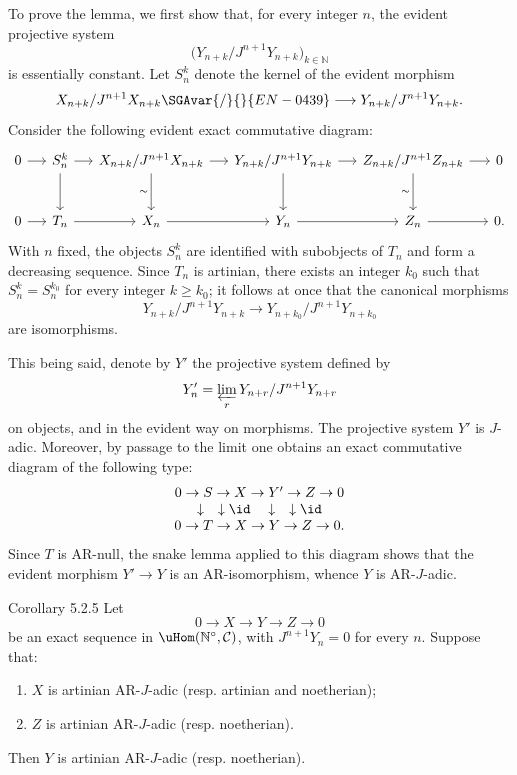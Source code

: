 \begin{prooftext}
To prove the lemma, we first show that, for every integer \(n\), the evident projective system
\[
\bigl(Y_{n+k}/J^{n+1}Y_{n+k}\bigr)_{k\in\mathbb N}
\]
is essentially constant. Let \(S_n^k\) denote the kernel of the evident morphism
\[
X_{n+k}/J^{n+1}X_{n+k}\SGAvar{/}{}{EN-0439}\longrightarrow
Y_{n+k}/J^{n+1}Y_{n+k}.
\]
Consider the following evident exact commutative diagram:
\[
\begin{tikzcd}[column sep=1.35em,row sep=large]
0 \arrow[r] & S_n^k \arrow[r] \arrow[d] & X_{n+k}/J^{n+1}X_{n+k} \arrow[r] \arrow[d,"\sim"'] & Y_{n+k}/J^{n+1}Y_{n+k} \arrow[r] \arrow[d] & Z_{n+k}/J^{n+1}Z_{n+k} \arrow[r] \arrow[d,"\sim"'] & 0\\
0 \arrow[r] & T_n \arrow[r] & X_n \arrow[r] & Y_n \arrow[r] & Z_n \arrow[r] & 0 .
\end{tikzcd}
\]
With \(n\) fixed, the objects \(S_n^k\) are identified with subobjects of \(T_n\) and form a decreasing sequence. Since \(T_n\) is artinian, there exists an integer \(k_0\) such that \(S_n^k=S_n^{k_0}\) for every integer \(k\ge k_0\); it follows at once that the canonical morphisms
\[
Y_{n+k}/J^{n+1}Y_{n+k}
\longrightarrow
Y_{n+k_0}/J^{n+1}Y_{n+k_0}
\]
are isomorphisms.

This being said, denote by \(Y'\) the projective system defined by
\[
Y'_n=\varprojlim_r Y_{n+r}/J^{n+1}Y_{n+r}
\]
on objects, and in the evident way on morphisms. The projective system \(Y'\) is \(J\)-adic. Moreover, by passage to the limit one obtains an exact commutative diagram of the following type:
\[
\begin{array}{ccccc}
0\to S\to X\to Y'\to Z\to0\\
\downarrow\quad\downarrow\id\quad\downarrow\quad\downarrow\id\\
0\to T\to X\to Y\to Z\to0 .
\end{array}
\]
Since \(T\) is AR-null, the snake lemma applied to this diagram shows that the evident morphism \(Y'\to Y\) is an AR-isomorphism, whence \(Y\) is AR-\(J\)-adic.
\end{prooftext}

\begin{statement}{Corollary 5.2.5}
Let
\[
0\longrightarrow X\longrightarrow Y\longrightarrow Z\longrightarrow0
\]
be an exact sequence in \(\uHom(\mathbb N^\circ,\mathcal C)\), with \(J^{n+1}Y_n=0\) for every \(n\). Suppose that:
\begin{enumerate}[label=\textup{(\roman*)}]
\item \(X\) is artinian AR-\(J\)-adic (resp. artinian and noetherian);
\item \(Z\) is artinian AR-\(J\)-adic (resp. noetherian).
\end{enumerate}
Then \(Y\) is artinian AR-\(J\)-adic (resp. noetherian).
\end{statement}

